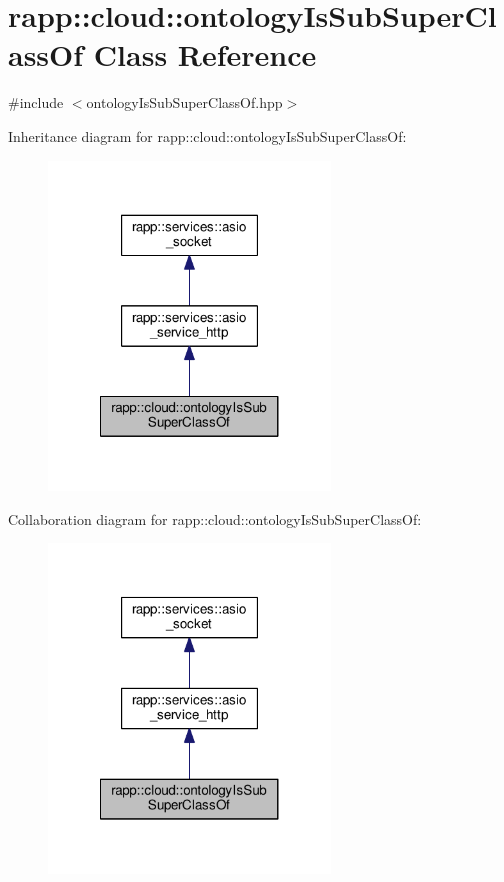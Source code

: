 \hypertarget{classrapp_1_1cloud_1_1ontologyIsSubSuperClassOf}{\section{rapp\-:\-:cloud\-:\-:ontology\-Is\-Sub\-Super\-Class\-Of Class Reference}
\label{classrapp_1_1cloud_1_1ontologyIsSubSuperClassOf}
}


{\ttfamily \#include $<$ontology\-Is\-Sub\-Super\-Class\-Of.\-hpp$>$}



Inheritance diagram for rapp\-:\-:cloud\-:\-:ontology\-Is\-Sub\-Super\-Class\-Of\-:
\nopagebreak
\begin{figure}[H]
\begin{center}
\leavevmode
\includegraphics[width=212pt]{classrapp_1_1cloud_1_1ontologyIsSubSuperClassOf__inherit__graph}
\end{center}
\end{figure}


Collaboration diagram for rapp\-:\-:cloud\-:\-:ontology\-Is\-Sub\-Super\-Class\-Of\-:
\nopagebreak
\begin{figure}[H]
\begin{center}
\leavevmode
\includegraphics[width=212pt]{classrapp_1_1cloud_1_1ontologyIsSubSuperClassOf__coll__graph}
\end{center}
\end{figure}
